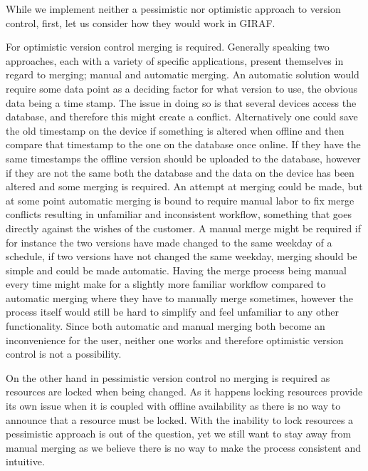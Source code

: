 \bigskip \noindent
While we implement neither a pessimistic nor optimistic approach to version control, first, let us consider how they would work in GIRAF. 

For optimistic version control merging is required. 
Generally speaking two approaches, each with a variety of specific applications, present themselves in regard to merging; manual and automatic merging.
An automatic solution would require some data point as a deciding factor for what version to use, the obvious data being a time stamp.
The issue in doing so is that several devices access the database, and therefore this might create a conflict.
Alternatively one could save the old timestamp on the device if something is altered when offline and then compare that timestamp to the one on the database once online. 
If they have the same timestamps the offline version should be uploaded to the database, however if they are not the same both the database and the data on the device has been altered and some merging is required. 
An attempt at merging could be made, but at some point automatic merging is bound to require manual labor to fix merge conflicts resulting in unfamiliar and inconsistent workflow, something that goes directly against the wishes of the customer.
A manual merge might be required if for instance the two versions have made changed to the same weekday of a schedule, if two versions have not changed the same weekday, merging should be simple and could be made automatic.
Having the merge process being manual every time might make for a slightly more familiar workflow compared to automatic merging where they have to manually merge sometimes, however the process itself would still be hard to simplify and feel unfamiliar to any other functionality. 
Since both automatic and manual merging both become an inconvenience for the user, neither one works and therefore optimistic version control is not a possibility.

\bigskip \noindent
On the other hand in pessimistic version control no merging is required as resources are locked when being changed.
As it happens locking resources provide its own issue when it is coupled with offline availability as there is no way to announce that a resource must be locked.
With the inability to lock resources a pessimistic approach is out of the question, yet we still want to stay away from manual merging as we believe there is no way to make the process consistent and intuitive.

